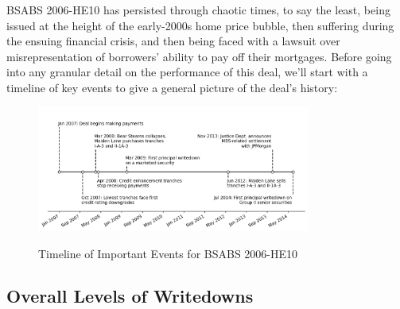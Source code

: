 \documentclass[12pt]{article}
\begin{document}
BSABS 2006-HE10 has persisted through chaotic times, to say the least, being issued at the height of the early-2000s home price bubble, then suffering during the ensuing financial crisis, and then being faced with a lawsuit over misrepresentation of borrowers’ ability to pay off their mortgages. Before going into any granular detail on the performance of this deal, we’ll start with a timeline of key events to give a general picture of the deal’s history:

\begin{figure}[h]
	\centering
	\caption{Timeline of Important Events for BSABS 2006-HE10}
	\includegraphics[width=0.8\textwidth]{../figures/timeline_of_important_events}
	\label{fig:timeline_of_important_events}
\end{figure}

\subsection*{Overall Levels of Writedowns}
\end{document}
